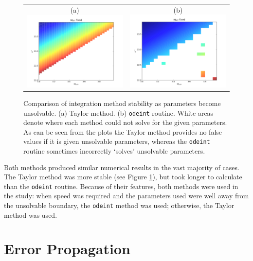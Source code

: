 \documentclass[12pt,a4paper,oneside]{article}
\begin{document}
\begin{figure}[th]
\begin{center}

\begin{tabular}{cc}
(a) \includegraphics[width=6.85cm]{figs/int-taylor.png} &
(b) \includegraphics[width=6.85cm]{figs/int-odeint.png}
\end{tabular}

\caption[]{Comparison of integration method stability as parameters become unsolvable. (a) Taylor method. (b) \texttt{odeint} routine. White areas denote where each method could not solve for the given parameters. As can be seen from the plots the Taylor method provides no false values if it is given unsolvable parameters, whereas the \texttt{odeint} routine sometimes incorrectly `solves' unsolvable parameters.}
\label{fig:int-comparison}
\end{center}
\end{figure}

Both methods produced similar numerical results in the vast majority of cases. The Taylor method was more stable (see Figure \ref{fig:int-comparison}), but took longer to calculate than the \texttt{odeint} routine. Because of their features, both methods were used in the study: when speed was required and the parameters used were well away from the unsolvable boundary, the \texttt{odeint} method was used; otherwise, the Taylor method was used.

\section{Error Propagation}
\label{apx:errors}
\end{document}
